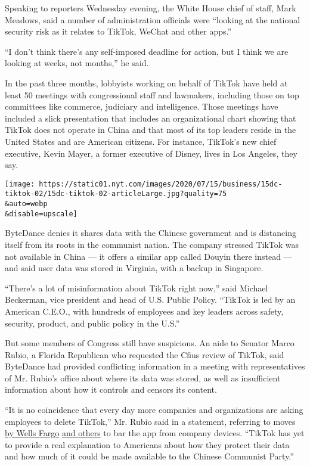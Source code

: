 Speaking to reporters Wednesday evening, the White House chief of staff,
Mark Meadows, said a number of administration officials were ``looking
at the national security risk as it relates to TikTok, WeChat and other
apps.''

``I don't think there's any self-imposed deadline for action, but I
think we are looking at weeks, not months,'' he said.

In the past three months, lobbyists working on behalf of TikTok have
held at least 50 meetings with congressional staff and lawmakers,
including those on top committees like commerce, judiciary and
intelligence. Those meetings have included a slick presentation that
includes an organizational chart showing that TikTok does not operate in
China and that most of its top leaders reside in the United States and
are American citizens. For instance, TikTok's new chief executive, Kevin
Mayer, a former executive of Disney, lives in Los Angeles, they say.

\texttt{[image: https://static01.nyt.com/images/2020/07/15/business/15dc-tiktok-02/15dc-tiktok-02-articleLarge.jpg?quality=75\\\&auto=webp\\\&disable=upscale]}

ByteDance denies it shares data with the Chinese government and is
distancing itself from its roots in the communist nation. The company
stressed TikTok was not available in China --- it offers a similar app
called Douyin there instead --- and said user data was stored in
Virginia, with a backup in Singapore.

``There's a lot of misinformation about TikTok right now,'' said Michael
Beckerman, vice president and head of U.S. Public Policy. ``TikTok is
led by an American C.E.O., with hundreds of employees and key leaders
across safety, security, product, and public policy in the U.S.''

But some members of Congress still have suspicions. An aide to Senator
Marco Rubio, a Florida Republican who requested the Cfius review of
TikTok, said ByteDance had provided conflicting information in a meeting
with representatives of Mr. Rubio's office about where its data was
stored, as well as insufficient information about how it controls and
censors its content.

``It is no coincidence that every day more companies and organizations
are asking employees to delete TikTok,'' Mr. Rubio said in a statement,
referring to moves
\href{https://www.cnn.com/2020/07/13/tech/tiktok-wells-fargo/index.html}{by
Wells Fargo}
\href{https://www.nytimes.com/2020/07/10/technology/tiktok-amazon-security-risk.html}{and
others} to bar the app from company devices. ``TikTok has yet to provide
a real explanation to Americans about how they protect their data and
how much of it could be made available to the Chinese Communist Party.''


